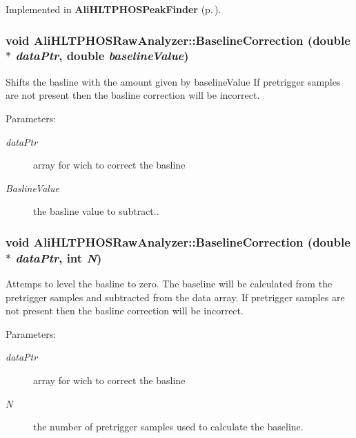 Implemented in {\bf Ali\-HLTPHOSPeak\-Finder} {\rm (p.\,\pageref{classAliHLTPHOSPeakFinder_a7})}.
\subsubsection{\setlength{\rightskip}{0pt plus 5cm}void Ali\-HLTPHOSRaw\-Analyzer::Baseline\-Correction (double $\ast$ {\em data\-Ptr}, double {\em baseline\-Value})}\label{classAliHLTPHOSRawAnalyzer_a5}


Shifts the basline with the amount given by baseline\-Value If pretrigger samples are not present then the basline correction will be incorrect. \begin{Desc}
\item[Parameters:]
\begin{description}
\item[{\em data\-Ptr}]array for wich to correct the basline \item[{\em Basline\-Value}]the basline value to subtract.. \end{description}
\end{Desc}
\subsubsection{\setlength{\rightskip}{0pt plus 5cm}void Ali\-HLTPHOSRaw\-Analyzer::Baseline\-Correction (double $\ast$ {\em data\-Ptr}, int {\em N})}\label{classAliHLTPHOSRawAnalyzer_a4}


Attemps to level the basline to zero. The baseline will be calculated from the pretrigger samples and subtracted from the data array. If pretrigger samples are not present then the basline correction will be incorrect. \begin{Desc}
\item[Parameters:]
\begin{description}
\item[{\em data\-Ptr}]array for wich to correct the basline \item[{\em N}]the number of pretrigger samples used to calculate the baseline. \end{description}
\end{Desc}
